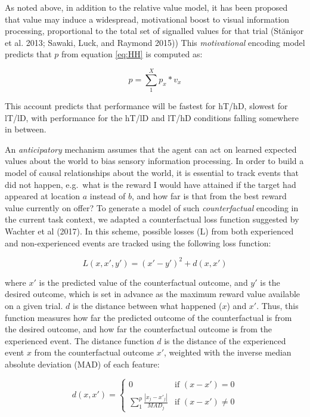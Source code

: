 \documentclass[11pt,halfline,a4paper,]{ouparticle}
\begin{document}
As noted above, in addition to the relative value model, it has been proposed that value may induce a widespread, motivational boost to visual information processing, proportional to the total set of signalled values for that trial (Stănişor et al. 2013; Sawaki, Luck, and Raymond 2015)) This \emph{motivational} encoding model predicts that \(p\) from equation \ref{eq:HH} is computed as:

\begin{equation}\label{eq:motiv}
  p = \sum_{1}^{X} p_x * v_x 
\end{equation}

This account predicts that performance will be fastest for hT/hD, slowest for lT/lD, with performance for the hT/lD and lT/hD conditions falling somewhere in between.

An \emph{anticipatory} mechanism assumes that the agent can act on learned expected values about the world to bias sensory information processing. In order to build a model of causal relationships about the world, it is essential to track events that did not happen, e.g.~what is the reward I would have attained if the target had appeared at location \(a\) instead of \(b\), and how far is that from the best reward value currently on offer? To generate a model of such \emph{counterfactual} encoding in the current task context, we adapted a counterfactual loss function suggested by Wachter et al (2017). In this scheme, possible losses (L) from both experienced and non-experienced events are tracked using the following loss function:

\begin{equation}\label{eq:counterFact}
  L(x, x', y') = (x' - y')^2 + d(x, x')
\end{equation}

where \(x'\) is the predicted value of the counterfactual outcome, and \(y'\) is the desired outcome, which is set in advance as the maximum reward value available on a given trial. \(d\) is the distance between what happened (\(x\)) and \(x'\). Thus, this function measures how far the predicted outcome of the counterfactual is from the desired outcome, and how far the counterfactual outcome is from the experienced event. The distance function \(d\) is the distance of the experienced event \(x\) from the counterfactual outcome \(x'\), weighted with the inverse median absolute deviation (MAD) of each feature:

\begin{equation}\label{eq:d}
  d(x, x') = 
    \begin{cases}
        0 &\text{if } (x - x') = 0 \\
        \sum_{1}^p \frac{|x_j - x'_j|}{MAD_j} &\text{if } (x - x') \neq 0
    \end{cases}
\end{equation}
\end{document}
